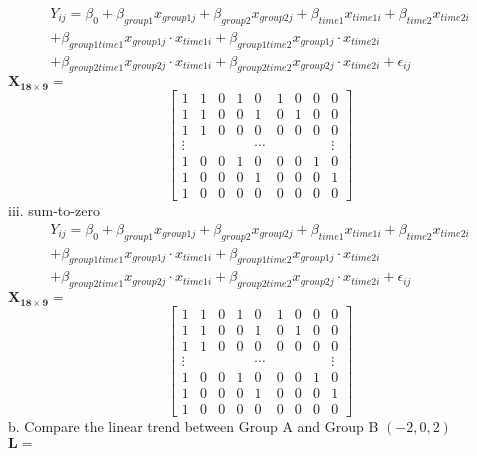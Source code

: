 \documentclass[12pt, utf8]{article}
\begin{document}
\begin{multline*}
 Y_{ij} = \beta_0  + \beta_{group1}x_{group1j} + \beta_{group2}x_{group2j} + \beta_{time1}x_{time 1i} + \beta_{time2}x_{time 2i}\\  +  \beta_{group1time1}x_{group1j} \cdot x_{time 1i}   +  \beta_{group1time2}x_{group1j} \cdot x_{time 2i} \\ +  \beta_{group2time1}x_{group2j} \cdot x_{time 1i}+ \beta_{group2time2}x_{group2j} \cdot x_{time 2i}+\epsilon_{ij} 
\end{multline*}
$\boldsymbol{X_{18 \times 9}} = $  
\[
\begin{bmatrix}
1 & 1 & 0 & 1 & 0 & 1 & 0 & 0 & 0 \\ 
1 & 1 & 0 & 0 & 1 & 0 & 1 & 0 & 0 \\
1 & 1 & 0 & 0 & 0 & 0 & 0 & 0 & 0 \\
\vdots  & & & & \cdots & & & & \vdots\\
1 & 0 & 0 & 1 & 0 & 0 & 0 & 1 & 0 \\ 
1 & 0 & 0 & 0 & 1 & 0 & 0 & 0 & 1 \\
1 & 0 & 0 & 0 & 0 & 0 & 0 & 0 & 0
\end{bmatrix}
\]
iii. sum-to-zero \\
\begin{multline*}
 Y_{ij} = \beta_0  + \beta_{group1}x_{group1j} + \beta_{group2}x_{group2j} + \beta_{time1}x_{time 1i} + \beta_{time2}x_{time 2i}\\  +  \beta_{group1time1}x_{group1j} \cdot x_{time 1i}   +  \beta_{group1time2}x_{group1j} \cdot x_{time 2i} \\ +  \beta_{group2time1}x_{group2j} \cdot x_{time 1i}+ \beta_{group2time2}x_{group2j} \cdot x_{time 2i}+\epsilon_{ij} 
\end{multline*}
$\boldsymbol{X_{18 \times 9}} =$  
\[
\begin{bmatrix}
1 & 1 & 0 & 1 & 0 & 1 & 0 & 0 & 0 \\ 
1 & 1 & 0 & 0 & 1 & 0 & 1 & 0 & 0 \\
1 & 1 & 0 & 0 & 0 & 0 & 0 & 0 & 0 \\
\vdots  & & & & \cdots & & & & \vdots\\
1 & 0 & 0 & 1 & 0 & 0 & 0 & 1 & 0 \\ 
1 & 0 & 0 & 0 & 1 & 0 & 0 & 0 & 1 \\
1 & 0 & 0 & 0 & 0 & 0 & 0 & 0 & 0
\end{bmatrix}
\]
b. Compare the linear trend between Group A and Group B $(-2, 0, 2)$\\ 
$ \boldsymbol{L} = $
\end{document}
